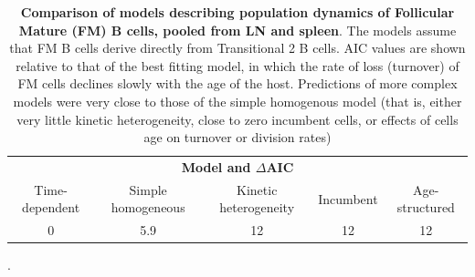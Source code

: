 \documentclass[11pt]{article}
\begin{document}
\begin{table}[h!]
	\begin{center}
		\renewcommand{\arraystretch}{1.25}
		\begin{tabular}{c c c c c} 
			\toprule 
			 \multicolumn{5}{c}{\textbf{Model and $\Delta$AIC}} \\
			\cline{1-5}
			 {\small Time-dependent}  & {\small Simple homogeneous} &  {\small Kinetic heterogeneity} & {\small Incumbent}  & {\small Age-structured} \\ 
			\toprule
			 0      &  5.9  & 12 & 12  &  12  \\ 
			\hline
			\toprule 
		\end{tabular}
	\end{center}
	\caption{\small \textbf{Comparison of models describing population dynamics of Follicular Mature (FM) B cells, pooled from LN and spleen}. The models assume that FM B cells derive directly from Transitional 2 B cells. AIC values are shown relative to that of the best fitting model, in which the rate of loss  (turnover) of FM cells declines slowly with the age of the host. Predictions of more complex models were very close to those of the simple homogenous model (that is, either very little kinetic heterogeneity, close to zero incumbent cells, or effects of cells age on turnover or division rates)}. 
	\label{tab:FM-AICs}
\end{table} 

%
\end{document}
